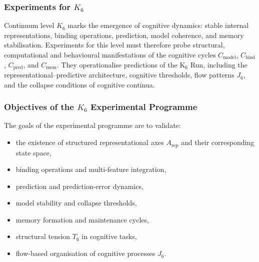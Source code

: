 
\subsubsection{Experiments for \texorpdfstring{$K_6$}{K_6}}
\label{sec:experiments-k6}

Continuum level $K_6$ marks the emergence of cognitive dynamics:
stable internal representations, binding operations, prediction,
model coherence, and memory stabilisation.  
Experiments for this level must therefore probe structural,
computational and behavioural manifestations of the cognitive
cycles $C_{\mathrm{model}}$, $C_{\mathrm{bind}}$,
$C_{\mathrm{pred}}$, and $C_{\mathrm{mem}}$.
They operationalise predictions of the K$_6$ Run, including
the representational–predictive architecture, cognitive thresholds,
flow patterns $J_6$, and the collapse conditions of cognitive continua.



\subsubsection{Objectives of the \texorpdfstring{$K_6$}{K_6} Experimental Programme}

The goals of the experimental programme are to validate:

\begin{itemize}
    \item the existence of structured representational axes 
          $A_{\mathrm{rep}}$ and their corresponding state space,
    \item binding operations and multi-feature integration,
    \item prediction and prediction-error dynamics,
    \item model stability and collapse thresholds,
    \item memory formation and maintenance cycles,
    \item structural tension $T_6$ in cognitive tasks,
    \item flow-based organisation of cognitive processes $J_6$.
\end{itemize}



